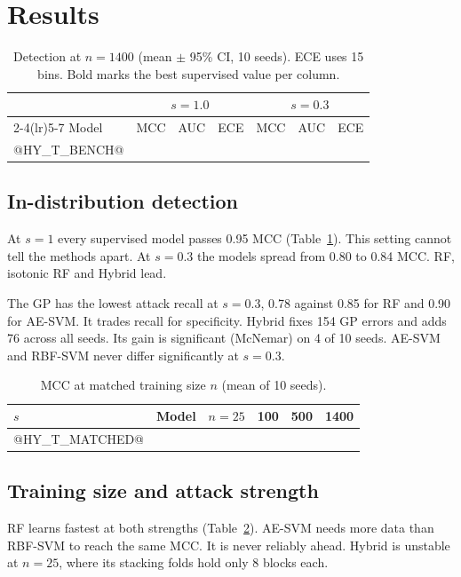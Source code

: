 \documentclass[conference,10pt]{IEEEtran}
\begin{document}
\section{Results}

\begin{table}[t]
  \centering
  \caption{Detection at $n=1400$ (mean $\pm$ 95\% CI, 10 seeds). ECE uses 15 bins. Bold marks the best supervised value per column.}
  \label{tab:bench}
  \footnotesize
  \begin{tabular}{lcccccc}
    \toprule
    & \multicolumn{3}{c}{$s=1.0$} & \multicolumn{3}{c}{$s=0.3$} \\
    \cmidrule(lr){2-4}\cmidrule(lr){5-7}
    Model & MCC & AUC & ECE & MCC & AUC & ECE \\
    \midrule
@HY_T_BENCH@
    \bottomrule
  \end{tabular}
\end{table}

\subsection{In-distribution detection}

At $s=1$ every supervised model passes 0.95 MCC (Table~\ref{tab:bench}). This
setting cannot tell the methods apart. At $s=0.3$ the models spread from 0.80 to
0.84 MCC. RF, isotonic RF and Hybrid lead.

The GP has the lowest attack recall at $s=0.3$, 0.78 against 0.85 for RF and
0.90 for AE-SVM. It trades recall for specificity. Hybrid fixes 154 GP errors
and adds 76 across all seeds. Its gain is significant (McNemar) on 4 of 10
seeds. AE-SVM and RBF-SVM never differ significantly at $s=0.3$.

\begin{table}[t]
  \centering
  \caption{MCC at matched training size $n$ (mean of 10 seeds).}
  \label{tab:matched}
  \footnotesize
  \setlength{\tabcolsep}{4pt}
  \begin{tabular}{llcccc}
    \toprule
    $s$ & Model & $n=25$ & 100 & 500 & 1400 \\
    \midrule
@HY_T_MATCHED@
    \bottomrule
  \end{tabular}
\end{table}

\subsection{Training size and attack strength}

RF learns fastest at both strengths (Table~\ref{tab:matched}). AE-SVM needs more
data than RBF-SVM to reach the same MCC. It is never reliably ahead. Hybrid is
unstable at $n=25$, where its stacking folds hold only 8 blocks each.
\end{document}
